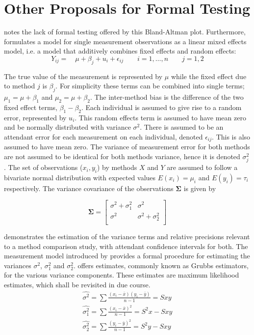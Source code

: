 \documentclass[12pt, a4paper]{report}
\theoremstyle{plain}
\theoremstyle{definition}
\theoremstyle{remark}
\begin{document}
\section{Other Proposals for Formal Testing}
\citet{Kinsella} notes the lack of formal testing offered by
this Bland-Altman plot. Furthermore, \citet{Kinsella} formulates a model for
single measurement observations as a
linear mixed effects model, i.e. a model that additively combines
fixed effects and random effects:
\[
Y_{ij} =\quad \mu + \beta_{j} + u_{i} + \epsilon_{ij} \qquad i = 1,\dots,n
\qquad j=1,2\]

The true value of the measurement is represented by $\mu$ while the fixed effect due to method $j$ is $\beta_{j}$.
For simplicity these terms can be combined into single terms; $\mu_{1} = \mu+ \beta_{1}$ and $\mu_{2} = \mu + \beta_{2}$. The inter-method bias is the difference of the two fixed effect terms, $\beta_{1}-\beta_{2}$. Each individual is assumed to give rise to a random error, represented by $u_{i}$. This random effects term is assumed to have mean zero and be normally distributed with variance $\sigma^2$. There is assumed to be an attendant error for each measurement on each individual, denoted $\epsilon_{ij}$. This is also assumed to have mean zero. The variance of measurement error for both methods are not assumed to be identical for both methods variance,  hence it is denoted $\sigma^2_{j}$. The set of observations ($x_{i},y_{i}$) by methods $X$ and $Y$ are assumed to follow a bivariate normal distribution with expected values $E(x_{i})= \mu_{i}$ and $E(y_{i})= \tau_{i}$ respectively. The variance covariance of the observations $\boldsymbol{\Sigma}$ is given by

\[
\boldsymbol{\Sigma} = \left[
\begin{array}{cc}
\sigma^{2} + \sigma^{2}_{1} & \sigma^{2} \\
\sigma^{2} & \sigma^{2} + \sigma^{2}_{2} \\
\end{array}
\right]
\] 

\citet{Kinsella} demonstrates the estimation of the variance terms and relative precisions relevant to a method comparison study, with attendant confidence intervals for both. The measurement model introduced by \citet{Grubbs48,Grubbs73} provides a formal procedure for estimating the variances $\sigma^2$, $\sigma^2_{1}$ and $\sigma^2_{2}$. \citet{Grubbs48} offers estimates, commonly known as Grubbs estimators, for the various variance components. These estimates are maximum likelihood estimates, which shall be revisited in due course.
\begin{eqnarray*}
	\hat{\sigma^{2}} = \sum{\frac{(x_{i}-\bar{x})(y_{i}-\bar{y})}{n-1}} = Sxy\\
	\hat{\sigma^{2}_{1}} = \sum{\frac{(x_{i}-\bar{x})^{2}}{n-1}} =S^{2}x - Sxy  \\
	\hat{\sigma^{2}_{2}} =
	\sum{\frac{(y_{i}-\bar{y})^{2}}{n-1}} = S^{2}y - Sxy
\end{eqnarray*}
\end{document}
